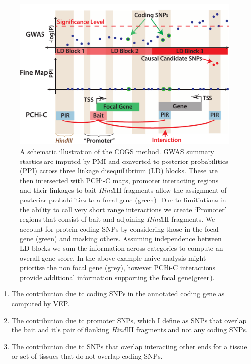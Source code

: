 \documentclass[a4paper,11pt]{report}
\begin{document}
\begin{figure}[h]
\includegraphics[width=\textwidth]{cogs3.pdf}
\caption{A schematic illustration of the COGS method. GWAS summary stastics are imputed by PMI and converted to posterior probabilities (PPI) across three linkage disequillibrium (LD) blocks. These are then intersected with PCHi-C maps, promoter interacting regions and their linkages to bait \textit{Hind}III fragments allow the assignment of posterior probabilities to a focal gene (green). Due to limitiations in the ability to call very short range interactions we create `Promoter' regions that consist of bait and adjoining \textit{Hind}III fragments. We account for protein coding SNPs by considering those in the focal gene (green) and masking others. Assuming independence between LD blocks we sum the information across categories to compute an overall gene score. In the above example naive analysis might prioritse the non focal gene (grey), however PCHi-C interactions provide additional information supporting the focal gene(green).}
\label{fig:cogs}
\centering
\end{figure}

\begin{enumerate}
\item The contribution due to coding SNPs in the annotated coding gene as computed by VEP.
\item The contribution due to promoter SNPs, which I define as SNPs that overlap the bait and it's pair of flanking \textit{Hind}III fragments and not any coding SNPs.
\item The contribution due to SNPs that overlap interacting other ends for a tissue or set of tissues that do not overlap coding SNPs. 
\end{enumerate}
\end{document}
